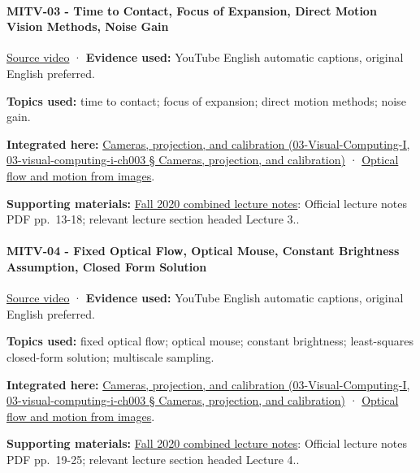 \paragraph{MITV-03 - Time to Contact, Focus of Expansion, Direct Motion Vision Methods, Noise Gain}\label{mitv-03---time-to-contact-focus-of-expansion-direct-motion-vision-methods-noise-gain}

\href{https://www.youtube.com/watch?v=t9w_WuyVJ-A}{Source video} · \textbf{Evidence used:} YouTube English automatic captions, original English preferred.

\textbf{Topics used:} time to contact; focus of expansion; direct motion methods; noise gain.

\textbf{Integrated here:} \href{}{Cameras, projection, and calibration (03-Visual-Computing-I, 03-visual-computing-i-ch003 § Cameras, projection, and calibration)} · \hyperref[04-visual-computing-ii-ch030]{Optical flow and motion from images}.

\textbf{Supporting materials:} \href{https://ocw.mit.edu/courses/6-801-machine-vision-fall-2020/9ec44f69e72995c370b3797818ba01e6_MIT6_801F20_lectureNotes.pdf}{Fall 2020 combined lecture notes}: Official lecture notes PDF pp.~13-18; relevant lecture section headed Lecture 3..

\paragraph{MITV-04 - Fixed Optical Flow, Optical Mouse, Constant Brightness Assumption, Closed Form Solution}\label{mitv-04---fixed-optical-flow-optical-mouse-constant-brightness-assumption-closed-form-solution}

\href{https://www.youtube.com/watch?v=3NarS3QpaU0}{Source video} · \textbf{Evidence used:} YouTube English automatic captions, original English preferred.

\textbf{Topics used:} fixed optical flow; optical mouse; constant brightness; least-squares closed-form solution; multiscale sampling.

\textbf{Integrated here:} \href{}{Cameras, projection, and calibration (03-Visual-Computing-I, 03-visual-computing-i-ch003 § Cameras, projection, and calibration)} · \hyperref[04-visual-computing-ii-ch030]{Optical flow and motion from images}.

\textbf{Supporting materials:} \href{https://ocw.mit.edu/courses/6-801-machine-vision-fall-2020/9ec44f69e72995c370b3797818ba01e6_MIT6_801F20_lectureNotes.pdf}{Fall 2020 combined lecture notes}: Official lecture notes PDF pp.~19-25; relevant lecture section headed Lecture 4..

